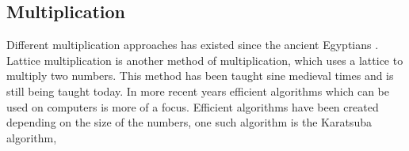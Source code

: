 
\subsection{Multiplication} 
Different multiplication approaches has existed since the ancient Egyptians \cite{ancientmult}. Lattice multiplication is another method of multiplication, which uses a lattice to multiply two numbers. This method has been taught sine medieval times and is still being taught today. In more recent years efficient algorithms which can be used on computers is more of a focus. Efficient algorithms have been created depending on the size of the numbers, one such algorithm is the Karatsuba algorithm,

